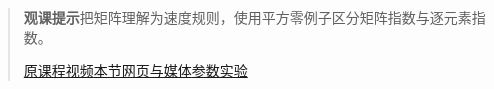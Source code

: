\begin{quote}\small\textbf{观课提示}\quad 把矩阵理解为速度规则，使用平方零例子区分矩阵指数与逐元素指数。

\href{https://www.youtube.com/watch?v=O85OWBJ2ayo}{原课程视频}\quad\href{https://vitael04213.github.io/3blue1brown-notes/lessons/matrix-exponents.html}{本节网页与媒体}\quad\href{https://vitael04213.github.io/3blue1brown-notes/lab.html\#phase}{参数实验}
\end{quote}
